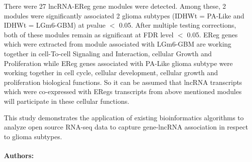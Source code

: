 There were 27 lncRNA-EReg gene modules were detected. Among these, 2 modules
were significantly associated 2 glioma subtypes (IDHWt = PA-Like and IDHWt = LGm6-GBM) at
pvalue $<$ 0.05. After multiple testing corrections, both of these modules remain as significant at
FDR level $<$ 0.05. EReg genes which were extracted from module associated with LGm6-GBM
are working together in cell-To-cell Signaling and Interaction, cellular Growth and Proliferation
while EReg genes associated with PA-Like glioma subtype were working together in cell cycle,
cellular development, cellular growth and proliferation biological functions. So it can be assumed
that lncRNA transcripts which were co-expressed with ERegs transcripts from above mentioned
modules will participate in these cellular functions.

 This study demonstrates the application of existing bioinformatics algorithms to
analyze open source RNA-seq data to capture gene-lncRNA association in respect to glioma
subtypes.

\noindent \paragraph{Authors:} 

